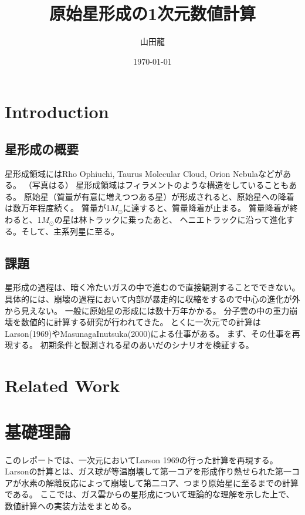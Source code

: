 \documentclass[a4j, dvipdfmx]{jsarticle}
\date{\today}
\author{山田龍}
\title{原始星形成の1次元数値計算}
\begin{document}
\maketitle
\tableofcontents
\section{Introduction}
\subsection{星形成の概要}
星形成領域にはRho Ophiuchi, Taurus Molecular Cloud, Orion Nebulaなどがある。
（写真はる）
星形成領域はフィラメントのような構造をしていることもある。
原始星（質量が有意に増えつつある星）が形成されると、原始星への降着は数万年程度続く。
質量が1$M_\odot$に達すると、質量降着が止まる。
質量降着が終わると、1$M_\odot$の星は林トラックに乗ったあと、
ヘニエトラックに沿って進化する。そして、主系列星に至る。

\subsection{課題}
星形成の過程は、暗く冷たいガスの中で進むので直接観測することでできない。
具体的には、崩壊の過程において内部が暴走的に収縮をするので中心の進化が外から見えない。
一般に原始星の形成には数十万年かかる。
分子雲の中の重力崩壊を数値的に計算する研究が行われてきた。
とくに一次元での計算はLarson(1969)やMasunagaInutsuka(2000)による仕事がある。
まず、その仕事を再現する。
初期条件と観測される星のあいだのシナリオを検証する。

\section{Related Work}
\section{基礎理論}
このレポートでは、一次元においてLarson 1969\cite{Larson}の行った計算を再現する。
Larsonの計算とは、ガス球が等温崩壊して第一コアを形成作り熱せられた第一コアが水素の解離反応によって崩壊して第二コア、つまり原始星に至るまでの計算である。
ここでは、ガス雲からの星形成について理論的な理解を示した上で、数値計算への実装方法をまとめる。
\end{document}
